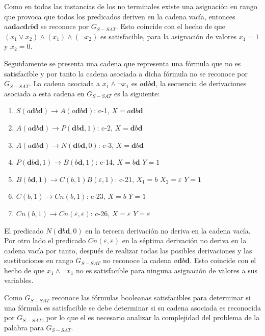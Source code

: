 \documentclass[12pt]{article}
\begin{document}
Como en todas las instancias de los no terminales existe una asignación en rango que provoca que todos los
predicados deriven en la cadena vacía, entonces $aa\mathbf{d}ac\mathbf{d}cb\mathbf{d}$ se reconoce por $G_{S-SAT}$. Esto coincide con el hecho de que $(x_1 \vee x_2) \wedge (x_1) \wedge (\neg x_2)$ es satisfacible, para la asignación de valores $x_1=1$ y $x_2=0$.

Seguidamente se presenta una cadena que representa una fórmula que no es satisfacible y por tanto la cadena asociada
a dicha fórmula no se reconoce por $G_{S-SAT}$. La cadena asociada a $x_1 \wedge \neg x_1$ es $a\mathbf{d}b\mathbf{d}$,
la secuencia de derivaciones asociada a esta cadena en $G_{S-SAT}$ es la siguiente:

\begin{enumerate}
    \item $S(a\mathbf{d}b\mathbf{d})\to A(a\mathbf{d}b\mathbf{d})$: c-1, $X=a\mathbf{d}b\mathbf{d}$
    \item $A(a\mathbf{d}b\mathbf{d})\to P(\mathbf{d}b\mathbf{d},1)$: c-2, $X=\mathbf{d}b\mathbf{d}$
    \item $A(a\mathbf{d}b\mathbf{d})\to N(\mathbf{d}b\mathbf{d},0)$: c-3, $X=\mathbf{d}b\mathbf{d}$
    \item $P(\mathbf{d}b\mathbf{d},1) \to B(b\mathbf{d},1)$: c-14, $X=b\mathbf{d}$ $Y=1$
    \item $B(b\mathbf{d},1)\to C(b,1) B(\varepsilon,1)$: c-21, $X_1=b$ $X_2=\varepsilon$ $Y=1$
    \item $C(b,1)\to Cn(b,1)$: c-23, $X=b$ $Y=1$
    \item $Cn(b,1)\to Cn(\varepsilon,\varepsilon)$: c-26, $X=\varepsilon$ $Y=\varepsilon$
\end{enumerate}


El predicado $N(\mathbf{d}b\mathbf{d},0)$ en la tercera derivación no deriva en la cadena vacía. Por otro lado
el predicado $Cn(\varepsilon,\varepsilon)$ en la séptima derivación no deriva en la cadena vacía por tanto,
después de realizar todas las posibles derivaciones y las sustituciones en rango $G_{S-SAT}$ no reconoce la cadena $a\mathbf{d}b\mathbf{d}$.  Esto coincide con el hecho de que $x_1 \wedge \neg x_1$ no es satisfacible para ninguna asignación de valores a sus variables.

Como $G_{S-SAT}$ reconoce las fórmulas booleanas satisfacibles para determinar si una fórmula es satisfacible se debe determinar si su cadena asociada es reconocida por $G_{S-SAT}$, por lo que el es necesario analizar la complejidad del problema
de la palabra para $G_{S-SAT}$.
\end{document}
